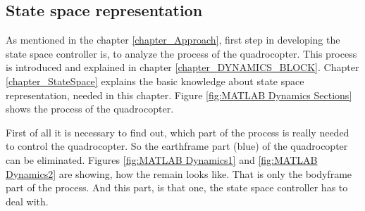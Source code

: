 \subsection{State space representation}\label{chapter_StateSpaceIMPL}

As mentioned in the chapter \ref{chapter_Approach}, first step in developing the state space controller is, to analyze the process of the quadrocopter. This process is introduced and explained in chapter \ref{chapter_DYNAMICS_BLOCK}. Chapter \ref{chapter_StateSpace} explains the basic knowledge about state space representation, needed in this chapter. Figure \ref{fig:MATLAB Dynamics Sections} shows the process of the quadrocopter. 

First of all it is necessary to find out, which part of the process is really needed to control the quadrocopter. So the earthframe part (blue) of the quadrocopter can be eliminated. 
Figures \ref{fig:MATLAB Dynamics1} and \ref{fig:MATLAB Dynamics2} are showing, how the remain looks like. That is only the bodyframe part of the process. And this part, is that one, the state space controller has to deal with.







